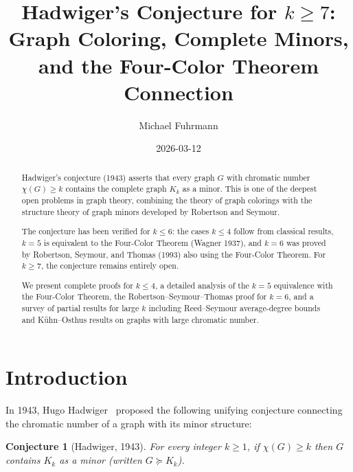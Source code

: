 \documentclass[12pt,a4paper]{amsart}
\newtheorem{conjecture}[theorem]{Conjecture}
\theoremstyle{definition}
\theoremstyle{remark}
\begin{document}
\title{Hadwiger's Conjecture for $k \geq 7$:\\
Graph Coloring, Complete Minors,\\
and the Four-Color Theorem Connection}

\author{Michael Fuhrmann}
\address{Specialist Mathematics Project, Build 166}
\date{2026-03-12}

\begin{abstract}
Hadwiger's conjecture (1943) asserts that every graph $G$ with chromatic number
$\chi(G) \geq k$ contains the complete graph $K_k$ as a minor. This is one of
the deepest open problems in graph theory, combining the theory of graph colorings
with the structure theory of graph minors developed by Robertson and Seymour.

The conjecture has been verified for $k \leq 6$: the cases $k \leq 4$ follow
from classical results, $k = 5$ is equivalent to the Four-Color Theorem (Wagner 1937),
and $k = 6$ was proved by Robertson, Seymour, and Thomas (1993) also using the
Four-Color Theorem. For $k \geq 7$, the conjecture remains entirely open.

We present complete proofs for $k \leq 4$, a detailed analysis of the $k = 5$
equivalence with the Four-Color Theorem, the Robertson--Seymour--Thomas proof
for $k = 6$, and a survey of partial results for large $k$ including
Reed--Seymour average-degree bounds and Kühn--Osthus results on graphs with
large chromatic number.
\end{abstract}

\maketitle

\tableofcontents

\section{Introduction}

In 1943, Hugo Hadwiger~\cite{Hadwiger1943} proposed the following unifying
conjecture connecting the chromatic number of a graph with its minor structure:

\begin{conjecture}[Hadwiger, 1943]\label{conj:hadwiger}
For every integer $k \geq 1$, if $\chi(G) \geq k$ then $G$ contains $K_k$ as
a minor (written $G \succeq K_k$).
\end{conjecture}
\end{document}
